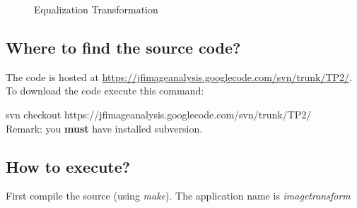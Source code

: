 \documentclass{article}
\begin{document}
	\begin{figure}[H]
	\centering
	\caption{Equalization Transformation}
	\label{fig:equalizing}
	\end{figure}


	\subsection{Where to find the source code?}

	The code is hosted at \url{https://jfimageanalysis.googlecode.com/svn/trunk/TP2/}. 
	To download the code execute this command:
	
	svn checkout https://jfimageanalysis.googlecode.com/svn/trunk/TP2/
	\\Remark: you {\bf must} have installed subversion. 
	
	\subsection{How to execute?}
	First compile the source (using {\it make}). The application name is {\it imagetransform} 
	
\end{document}
